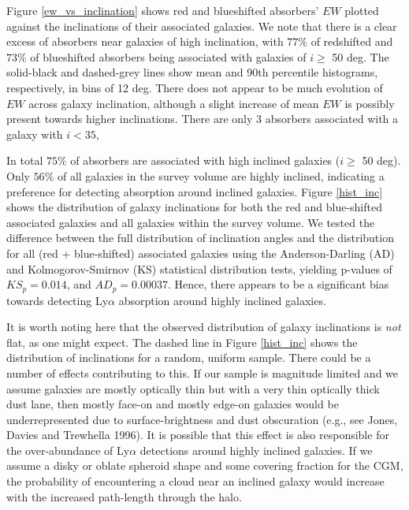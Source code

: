 \documentclass[iop]{emulateapj-rtx4}
\begin{document}
Figure \ref{ew_vs_inclination} shows red and blueshifted absorbers' $EW$ plotted against the inclinations of their associated galaxies. We note that there is a clear excess of absorbers near galaxies of high inclination, with $77\%$ of redshifted and $73\%$ of blueshifted absorbers being associated with galaxies of $i \geq$ 50 deg. The solid-black and dashed-grey lines show mean and 90th percentile histograms, respectively, in bins of 12 deg. There does not appear to be much evolution of $EW$ across galaxy inclination, although a slight increase of mean $EW$ is possibly present towards higher inclinations. There are only 3 absorbers associated with a galaxy with $i<35$, 

In total $75\%$ of absorbers are associated with high inclined galaxies ($i \geq$ 50 deg). Only $56\%$ of all galaxies in the survey volume are highly inclined, indicating a preference for detecting absorption around inclined galaxies. Figure \ref{hist_inc} shows the distribution of galaxy inclinations for both the red and blue-shifted associated galaxies and all galaxies within the survey volume. We tested the difference between the full distribution of inclination angles and the distribution for all (red + blue-shifted) associated galaxies using the Anderson-Darling (AD) and Kolmogorov-Smirnov (KS) statistical distribution tests, yielding p-values of $KS_{p} =0.014$, and $AD_{p} = 0.00037$. Hence, there appears to be a significant bias towards detecting Ly$\alpha$ absorption around highly inclined galaxies. 

It is worth noting here that the observed distribution of galaxy inclinations is \emph{not} flat, as one might expect. The dashed line in Figure \ref{hist_inc} shows the distribution of inclinations for a random, uniform sample. There could be a number of effects contributing to this. If our sample is magnitude limited and we assume galaxies are mostly optically thin but with a very thin optically thick dust lane, then mostly face-on and mostly edge-on galaxies would be underrepresented due to surface-brightness and dust obscuration (e.g., see Jones, Davies and Trewhella 1996). It is possible that this effect is also responsible for the over-abundance of Ly$\alpha$ detections around highly inclined galaxies. If we assume a disky or oblate spheroid shape and some covering fraction for the CGM, the probability of encountering a cloud near an inclined galaxy would increase with the increased path-length through the halo. 

\end{document}
